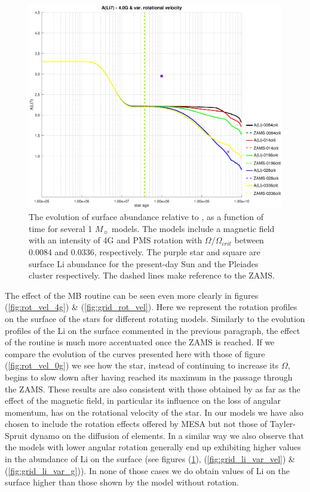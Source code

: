 \documentclass[fleqn,usenatbib]{mnras}
\begin{document}
\begin{figure}
	\includegraphics[trim = 40mm 15mm 20mm 15mm, clip,width=\columnwidth]{figures/li_var_vel_4_0g.eps}
    \caption{The evolution of surface  abundance relative to , as a function of time for several 1 $M_{\sun}$ models. The models include a magnetic field with an intensity of 4G and PMS rotation with $\Omega / \Omega_{crit}$ between 0.0084 and 0.0336, respectively. The purple star and square are surface Li abundance for the present-day Sun \citep{Asplund2009} and the Pleiades cluster \citep{Sestito2005} respectively. The dashed lines make reference to the ZAMS.}
    \label{fig:li_var_vel_4_0g}
\end{figure}

The effect of the MB routine can be seen even more clearly in figures (\ref{fig:rot_vel_4g}) \& (\ref{fig:grid_rot_vel}). Here we represent the rotation profiles on the surface of the stars for different rotating models. Similarly to the evolution profiles of the Li on the surface commented in the previous paragraph, the effect of the routine is much more accentuated once the ZAMS is reached. If we compare the evolution of the curves presented here with those of figure (\ref{fig:rot_vel_0g}) we see how the star, instead of continuing to increase its $\Omega$, begins to slow down after having reached its maximum in the passage through the ZAMS. These results are also consistent with those obtained by \citet{Eggenberger2010} as far as the effect of the magnetic field, in particular its influence on the loss of angular momentum, has on the rotational velocity of the star. In our models we have also chosen to include the rotation effects offered by MESA but not those of Tayler-Spruit dynamo on the diffusion of elements. In a similar way we also observe that the models with lower angular rotation generally end up exhibiting higher values in the abundance of Li on the surface (see figures (\ref{fig:li_var_vel_4_0g}), (\ref{fig:grid_li_var_vel}) \& (\ref{fig:grid_li_var_g})). In none of those cases we do obtain values of Li on the surface higher than those shown by the model without rotation.\par
\end{document}
